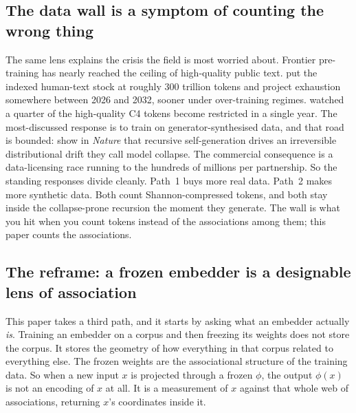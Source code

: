 \documentclass[10pt,twocolumn]{article}
\begin{document}
\subsection{The data wall is a symptom of counting the wrong thing}
The same lens explains the crisis the field is most worried about. Frontier
pre-training has nearly reached the ceiling of high-quality public text.
\citet{villalobos2022data} put the indexed human-text stock at roughly $300$
trillion tokens and project exhaustion somewhere between 2026 and 2032, sooner
under over-training regimes. \citet{longpre2024consent} watched a quarter of the
high-quality C4 tokens become restricted in a single year. The most-discussed
response is to train on generator-synthesised data, and that road is bounded:
\citet{shumailov2024collapse} show in \emph{Nature} that recursive
self-generation drives an irreversible distributional drift they call model
collapse. The commercial consequence is a data-licensing race running to the
hundreds of millions per partnership. So the standing responses divide cleanly.
Path~1 buys more real data. Path~2 makes more synthetic data. Both count
Shannon-compressed tokens, and both stay inside the collapse-prone recursion the
moment they generate. The wall is what you hit when you count tokens instead of
the associations among them; this paper counts the associations.

\subsection{The reframe: a frozen embedder is a designable lens of association}
This paper takes a third path, and it starts by asking what an embedder actually
\emph{is}. Training an embedder on a corpus and then freezing its weights does
not store the corpus. It stores the geometry of how everything in that corpus
related to everything else. The frozen weights are the associational structure of
the training data. So when a new input $x$ is projected through a frozen $\phi$,
the output $\phi(x)$ is not an encoding of $x$ at all. It is a measurement of $x$
against that whole web of associations, returning $x$'s coordinates inside it.
\end{document}
